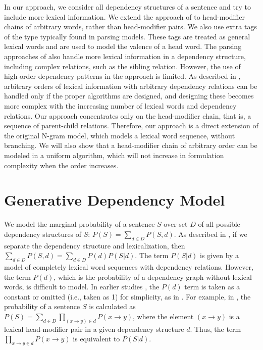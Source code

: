 \documentclass[english]{jnlp_1.4}
\begin{document}
In our approach, we consider all dependency structures of a sentence and try to include more lexical information. We extend the approach of \cite{lee1997} to head-modifier chains of arbitrary words, rather than head-modifier pairs. We also use extra tags of the type typically found in parsing models. These tags are treated as general lexical words and are used to model the valence of a head word. The parsing approaches of \cite{koo2010efficient} also handle more lexical information in a dependency structure, including complex relations, such as the sibling relation. However, the use of high-order dependency patterns in the approach is limited. As described in \cite{zhang2012generalized}, arbitrary orders of lexical information with arbitrary dependency relations can be handled only if the proper algorithms are designed, and designing these becomes more complex with the increasing number of lexical words and dependency relations. Our approach concentrates only on the head-modifier chain, that is, a sequence of parent-child relations. Therefore, our approach is a direct extension of the original N-gram model, which models a lexical word sequence, without branching. We will also show that a head-modifier chain of arbitrary order can be modeled in a uniform algorithm, 
which will not increase in formulation complexity when the order increases.


\section{Generative Dependency Model}
\label{generativemodel}

We model the marginal probability of a sentence $S$ over set $D$ of all possible dependency structures of $S$: $P (S) = \sum_{d \in D} P (S, d)$.  As described in \cite{klein2004}, if we separate the dependency structure and lexicalization, then $\sum_{d \in D} P (S, d) = \sum_{d \in D} P (d) P(S | d)$. The term $ P(S | d)$ is given by a model of completely lexical word sequences with dependency relations. However, the term $P (d)$, which is the probability of a dependency graph without lexical words, is difficult to model.
In earlier studies , the $P (d)$ term is taken as a constant or omitted (i.e., taken as 1) for simplicity, as in \cite{paskin2002,lee1998automatic}.
For example, in \cite{lee1998automatic}, the probability of a sentence $S$ is calculated as $P (S) = \sum_{d \in D} \prod_{(x \to y) \in d} P (x \to y)$, where the element $(x \to y)$ is a lexical head-modifier pair in a given dependency structure $d$. Thus, the term $\prod_{x \to y \in d} P (x \to y)$ is equivalent to $P(S | d)$. 
\end{document}
